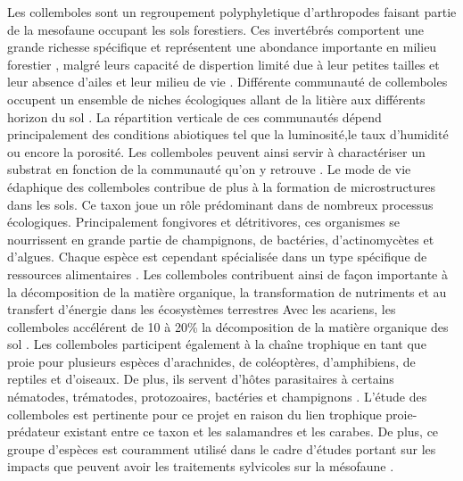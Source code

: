 Les collemboles sont un regroupement polyphyletique d'arthropodes faisant partie de la mesofaune occupant les sols forestiers.
Ces invertébrés comportent une grande richesse spécifique et représentent une abondance importante en milieu forestier \citep{rusekBiodiversityCollembolaTheir1998}, 
malgré leurs capacité de dispertion limité due à leur petites tailles et leur absence d’ailes et leur milieu de vie \citep{Ojala2001Dispersalmicroarthropods}.
Différente communauté de collemboles occupent un ensemble de niches écologiques allant de la litière aux différents horizon du sol \citep{pongeVerticalDistributionCollembola2000}.
La répartition verticale de ces communautés dépend principalement des conditions abiotiques tel que la luminosité,le taux d’humidité ou encore la porosité.
Les collemboles peuvent ainsi servir à charactériser un substrat en fonction de la communauté qu’on y retrouve \citep{rusekBiodiversityCollembolaTheir1998}.
Le mode de vie édaphique des collemboles contribue de plus à la formation de microstructures dans les sols.
Ce taxon joue un rôle prédominant dans de nombreux processus écologiques. 
Principalement fongivores et détritivores, ces organismes se nourrissent en grande partie de champignons, de bactéries, d'actinomycètes et d'algues. 
Chaque espèce est cependant spécialisée dans un type spécifique de ressources alimentaires \citep{Chen1995Foodpreference,rusekBiodiversityCollembolaTheir1998}.
Les collemboles contribuent ainsi de façon importante à la décomposition de la matière organique, la transformation de nutriments et 
au transfert d’énergie dans les écosystèmes terrestres \citep{Cuchta2019importantrole,Hattenschwiler2005Biodiversitylitter,Marsden2020Howagroforestry,Petersen2000Collembolapopulations,rusekBiodiversityCollembolaTheir1998,Wolters1991SoilInvertebrates}
Avec les acariens, les collemboles accélérent de 10 à 20\% la décomposition de la matière organique des sol \citep{Hattenschwiler2005Biodiversitylitter}.
Les collemboles participent également à la chaîne trophique en tant que proie pour plusieurs espèces d’arachnides, de coléoptères, d’amphibiens, 
de reptiles et d’oiseaux. De plus, ils servent d’hôtes parasitaires à certains nématodes, trématodes, protozoaires, bactéries et champignons \citep{rusekBiodiversityCollembolaTheir1998}.
L'étude des collemboles est pertinente pour ce projet en raison du lien trophique proie-prédateur existant entre ce taxon et les salamandres et les carabes. 
De plus, ce groupe d'espèces est couramment utilisé dans le cadre d'études portant sur les impacts que peuvent avoir les traitements sylvicoles sur la mésofaune \citep{farskaManagementIntensityAffects2014,rousseauWoodyBiomassRemoval2019,Salmon2008Relationshipssoil}.

